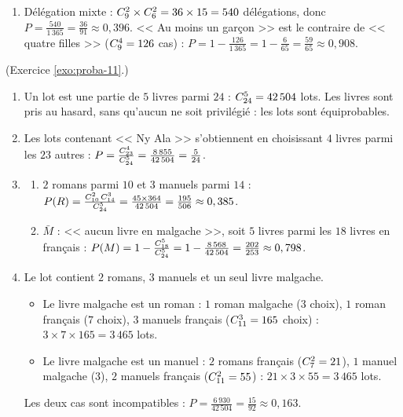 \begin{corrige}
\begin{sol}
\begin{enumerate}
\item D\'el\'egation mixte : $C_{9}^{2}\times C_{6}^{2} = 36\times 15 = 540$ d\'el\'egations, donc $P = \frac{540}{1\,365} = \frac{36}{91}\approx 0,396$.
      << Au moins un gar\c{c}on >> est le contraire de << quatre filles >> ($C_{9}^{4} = 126$ cas) :
      $P = 1 - \frac{126}{1\,365} = 1 - \frac{6}{65} = \frac{59}{65}\approx 0,908$.
\end{enumerate}
\end{sol}
%
\begin{sol} (Exercice \ref{exo:proba-11}.)
\begin{enumerate}
\item Un lot est une partie de $5$ livres parmi $24$ : $C_{24}^{5} = 42\,504$ lots.
      Les livres sont pris au hasard, sans qu'aucun ne soit privil\'egi\'e : les lots sont \'equiprobables.
\item Les lots contenant << Ny Ala >> s'obtiennent en choisissant $4$ livres parmi les $23$ autres :
      $P = \frac{C_{23}^{4}}{C_{24}^{5}} = \frac{8\,855}{42\,504} = \frac{5}{24}$.
\item \begin{enumerate}
      \item $2$ romans parmi $10$ et $3$ manuels parmi $14$ : $P(R) = \frac{C_{10}^{2}\,C_{14}^{3}}{C_{24}^{5}} = \frac{45\times 364}{42\,504} = \frac{195}{506}\approx 0,385$.
      \item $\bar{M}$ : << aucun livre en malgache >>, soit $5$ livres parmi les $18$ livres en fran\c{c}ais :
            $P(M) = 1 - \frac{C_{18}^{5}}{C_{24}^{5}} = 1 - \frac{8\,568}{42\,504} = \frac{202}{253}\approx 0,798$.
      \end{enumerate}
\item Le lot contient $2$ romans, $3$ manuels et un seul livre malgache.
      \begin{itemize}
      \item Le livre malgache est un roman : $1$ roman malgache ($3$ choix), $1$ roman fran\c{c}ais ($7$ choix), $3$ manuels fran\c{c}ais ($C_{11}^{3} = 165$ choix) :
            $3\times 7\times 165 = 3\,465$ lots.
      \item Le livre malgache est un manuel : $2$ romans fran\c{c}ais ($C_{7}^{2} = 21$), $1$ manuel malgache ($3$), $2$ manuels fran\c{c}ais ($C_{11}^{2} = 55$) :
            $21\times 3\times 55 = 3\,465$ lots.
      \end{itemize}
      Les deux cas sont incompatibles : $P = \frac{6\,930}{42\,504} = \boxed{\frac{15}{92}}\approx 0,163$.
\end{enumerate}

\end{sol}
\end{corrige}
